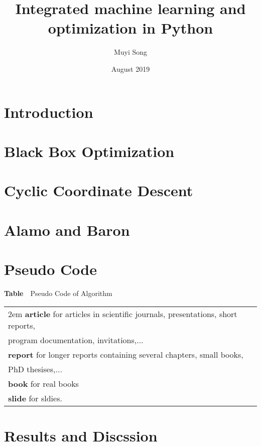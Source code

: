 \documentclass{article}
\title{Integrated machine learning and optimization in Python}
\author{Muyi Song}
\date{August 2019}
\begin{document}
\maketitle

\tableofcontents
\section{Introduction}

\section{Black Box Optimization}

\section{Cyclic Coordinate Descent}

\section{Alamo and Baron}

\section{Pseudo Code}
\begin{center}
\textbf{Table}~~Pseudo Code of Algorithm
\begin{tabular}{lp{3cm}}
  \hline
  \hangafter=1
  \hangindent 2em
  \textbf{article} for articles in scientific journals, presentations, short reports,\\ program documentation, invitations,...\\
  \textbf{report} for longer reports containing several chapters, small books, \\PhD thesises,...\\
  \textbf{book} for real books\\
  \textbf{slide} for sldies. 
\end{tabular}  
\end{center}

\section{Results and Discssion}

\end{document}
